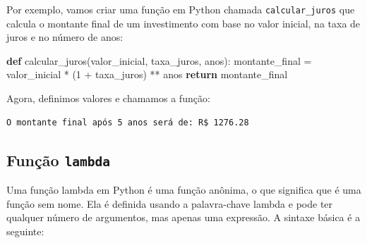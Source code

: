 \documentclass[
  portuguese,
  letterpaper,
  DIV=11,
  numbers=noendperiod]{scrreprt}
\newenvironment{Shaded}{\begin{snugshade}}{\end{snugshade}}
\newcommand{\BuiltInTok}[1]{\textcolor[rgb]{0.00,0.23,0.31}{#1}}
\newcommand{\CommentTok}[1]{\textcolor[rgb]{0.37,0.37,0.37}{#1}}
\newcommand{\ControlFlowTok}[1]{\textcolor[rgb]{0.00,0.23,0.31}{\textbf{#1}}}
\newcommand{\DecValTok}[1]{\textcolor[rgb]{0.68,0.00,0.00}{#1}}
\newcommand{\FloatTok}[1]{\textcolor[rgb]{0.68,0.00,0.00}{#1}}
\newcommand{\KeywordTok}[1]{\textcolor[rgb]{0.00,0.23,0.31}{\textbf{#1}}}
\newcommand{\NormalTok}[1]{\textcolor[rgb]{0.00,0.23,0.31}{#1}}
\newcommand{\OperatorTok}[1]{\textcolor[rgb]{0.37,0.37,0.37}{#1}}
\newcommand{\StringTok}[1]{\textcolor[rgb]{0.13,0.47,0.30}{#1}}
\theoremstyle{definition}
\theoremstyle{remark}
\begin{document}
Por exemplo, vamos criar uma função em Python chamada
\texttt{calcular\_juros} que calcula o montante final de um investimento
com base no valor inicial, na taxa de juros e no número de anos:

\begin{Shaded}
\begin{Highlighting}[]
\KeywordTok{def}\NormalTok{ calcular\_juros(valor\_inicial, taxa\_juros, anos):}
\NormalTok{    montante\_final }\OperatorTok{=}\NormalTok{ valor\_inicial }\OperatorTok{*}\NormalTok{ (}\DecValTok{1} \OperatorTok{+}\NormalTok{ taxa\_juros) }\OperatorTok{**}\NormalTok{ anos}
    \ControlFlowTok{return}\NormalTok{ montante\_final}
\end{Highlighting}
\end{Shaded}

Agora, definimos valores e chamamos a função:

\begin{Shaded}
\end{Shaded}

\begin{verbatim}
O montante final após 5 anos será de: R$ 1276.28
\end{verbatim}

\subsection{\texorpdfstring{Função
\texttt{lambda}}{Função lambda}}\label{funuxe7uxe3o-lambda}

Uma função lambda em Python é uma função anônima, o que significa que é
uma função sem nome. Ela é definida usando a palavra-chave lambda e pode
ter qualquer número de argumentos, mas apenas uma expressão. A sintaxe
básica é a seguinte:
\end{document}
